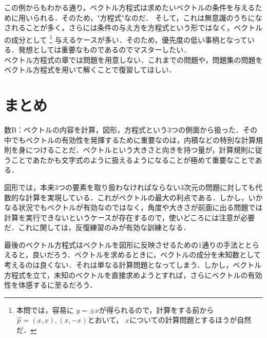 \documentclass[dvipdfmx]{jsarticle}
\begin{document}
    この例からもわかる通り，ベクトル方程式は求めたいベクトルの条件を与えるために用いられる．そのため，"方程式"なのだ．
    そして，これは無意識のうちになされることが多く，さらには条件の与え方を方程式という形ではなく，ベクトルの成分として
    \footnote{本問では，容易に \(y=\pm x\)が得られるので，計算をする前から \(\vec{p}=(x,x),(x,-x)\)とおいて， \(x\)についての計算問題とするほうが自然だ．}
    与えるケースが多い．そのため，優先度の低い事柄となっている．発想としては重要なものであるのでマスターしたい．\\

    ベクトル方程式の章では問題を用意しない．これまでの問題や，問題集の問題をベクトル方程式を用いて解くことで復習してほしい．

    \section*{まとめ}
    数B：ベクトルの内容を計算，図形，方程式という3つの側面から扱った．その中でもベクトルの有効性を発揮するために重要なのは，内積などの特別な計算規則を身につけることだ．ベクトルという大きさと向きを持つ量が，計算規則に従うことであたかも文字式のように扱えるようになることが極めて重要なことである．

    図形では，本来3つの要素を取り扱わなければならない3次元の問題に対しても代数的な計算を実現している．これがベクトルの最大の利点である．しかし，いかなる状況でもベクトルが有効なのではなく，角度や大きさが前面に出る問題では計算を実行できないというケースが存在するので，使いどころには注意が必要だ．これに関しては，反復練習のみが有効な訓練となる．

    最後のベクトル方程式はベクトルを図形に反映させるための1通りの手法ととらえると，良いだろう．ベクトルを求めるときに，ベクトルの成分を未知数として考えるのは良くない．それは単なる計算問題となってしまう．しかし，ベクトル方程式を立て，未知のベクトルを直接求めようとすれば，さらにベクトルの有効性を体感するに至るだろう．
\end{document}
